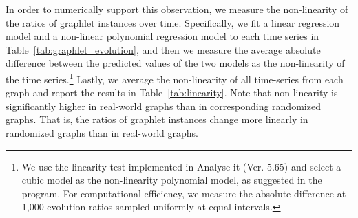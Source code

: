 \begin{table}[t]
\caption{\label{tab:linearity} 
The non-linearity of the ratios of graphlet instances over time in real-world graphs and randomized graphs. 
We describe in Section~\ref{section:graph:time} how the non-linearity is measured.
The lower the non-linearity is, the more linear the change of the ratio of the corresponding graphlet instances is.
Note that
the ratios of graphlet instances change more linearly in randomized graphs than in real-world graphs.
}
\end{table}
\noindent In order to numerically support this observation, we measure the non-linearity \cite{kroll1993theoretical, hsieh2008statistical} of the ratios of graphlet instances over time.
Specifically, we fit a linear regression model and a non-linear polynomial regression model to each time series in Table~\ref{tab:graphlet_evolution}, and then we measure the average absolute difference between the predicted values of the two models as the non-linearity of the time series.\footnote{We use the linearity test implemented in Analyse-it (Ver. 5.65) and select a cubic model as the non-linearity polynomial model, as suggested in the program. For computational efficiency, we measure the absolute difference at 1,000 evolution ratios sampled uniformly at equal intervals.}
Lastly, we average the non-linearity of all time-series from each graph and report the results in Table~\ref{tab:linearity}.
Note that non-linearity is significantly higher in real-world graphs than in corresponding randomized graphs. 
That is, the ratios of graphlet instances change more linearly in randomized graphs than in real-world graphs.


